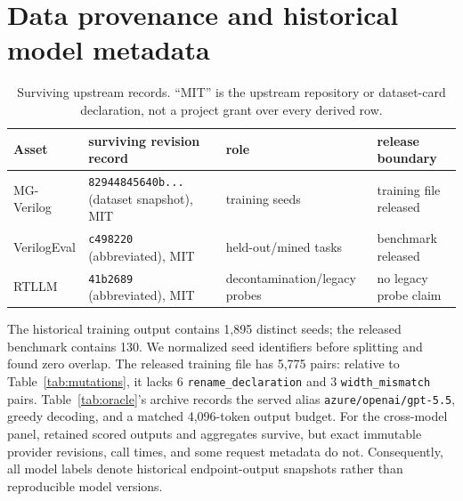 \documentclass{article}
\newcommand{\code}[1]{\texttt{#1}}
\begin{document}
\section{Data provenance and historical model metadata}\label{app:provenance}

\begin{table}[H]
\centering
\footnotesize
\setlength{\tabcolsep}{4pt}
\caption{Surviving upstream records. ``MIT'' is the upstream repository or dataset-card declaration,
not a project grant over every derived row.}
\begin{tabular}{@{}llll@{}}
\toprule
Asset & surviving revision record & role & release boundary \\
\midrule
MG-Verilog & \code{82944845640b...} (dataset snapshot), MIT & training seeds & training file released \\
VerilogEval & \code{c498220} (abbreviated), MIT & held-out/mined tasks & benchmark released \\
RTLLM & \code{41b2689} (abbreviated), MIT & decontamination/legacy probes & no legacy probe claim \\
\bottomrule
\end{tabular}
\end{table}

The historical training output contains 1{,}895 distinct seeds; the released benchmark contains 130.
We normalized seed identifiers before splitting and found zero overlap. The released training file
has 5{,}775 pairs: relative to Table~\ref{tab:mutations}, it lacks 6 \code{rename\_declaration} and 3
\code{width\_mismatch} pairs. Table~\ref{tab:oracle}'s archive records the served alias
\code{azure/openai/gpt-5.5}, greedy decoding, and a matched 4{,}096-token output budget. For the
cross-model panel, retained scored outputs and aggregates survive, but exact immutable provider
revisions, call times, and some request metadata do not. Consequently, all model labels denote
historical endpoint-output snapshots rather than reproducible model versions.
\end{document}
